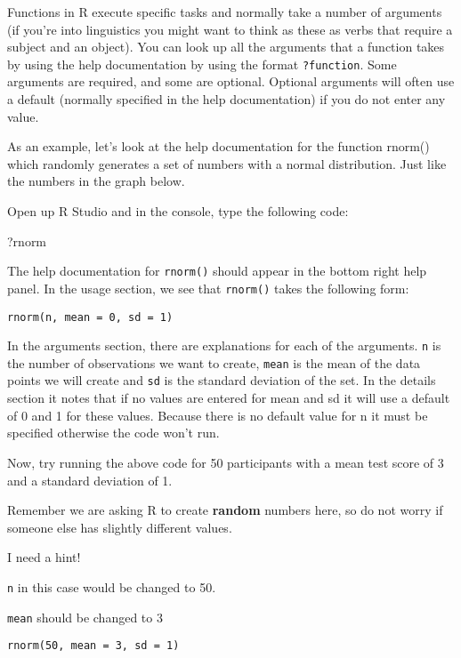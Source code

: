 \documentclass[]{book}
\newenvironment{Shaded}{\begin{snugshade}}{\end{snugshade}}
\newcommand{\NormalTok}[1]{#1}
\begin{document}
Functions in R execute specific tasks and normally take a number of
arguments (if you're into linguistics you might want to think as these
as verbs that require a subject and an object). You can look up all the
arguments that a function takes by using the help documentation by using
the format \texttt{?function}. Some arguments are required, and some are
optional. Optional arguments will often use a default (normally
specified in the help documentation) if you do not enter any value.

As an example, let's look at the help documentation for the function
rnorm() which randomly generates a set of numbers with a normal
distribution. Just like the numbers in the graph below.

Open up R Studio and in the console, type the following code:

\begin{Shaded}
\begin{Highlighting}[]
\NormalTok{?rnorm}
\end{Highlighting}
\end{Shaded}

The help documentation for \texttt{rnorm()} should appear in the bottom
right help panel. In the usage section, we see that \texttt{rnorm()}
takes the following form:

\begin{verbatim}
rnorm(n, mean = 0, sd = 1)
\end{verbatim}

In the arguments section, there are explanations for each of the
arguments. \texttt{n} is the number of observations we want to create,
\texttt{mean} is the mean of the data points we will create and
\texttt{sd} is the standard deviation of the set. In the details section
it notes that if no values are entered for mean and sd it will use a
default of 0 and 1 for these values. Because there is no default value
for n it must be specified otherwise the code won't run.

Now, try running the above code for 50 participants with a mean test
score of 3 and a standard deviation of 1.

Remember we are asking R to create \textbf{random} numbers here, so do
not worry if someone else has slightly different values.

I need a hint!

\texttt{n} in this case would be changed to 50.

\texttt{mean} should be changed to 3

\texttt{rnorm(50,\ mean\ =\ 3,\ sd\ =\ 1)}
\end{document}
